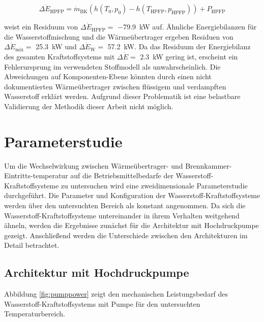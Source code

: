 \begin{equation}\label{Eq:brewer}
	\Delta \dot{E}_\mathrm{HPFP}=\dot{m}_\mathrm{BK}(h(T_0,p_0)-h(T_\mathrm{HPFP}, p_\mathrm{HPFP}))+P_\mathrm{HPFP}
\end{equation}

weist ein Residuum von $\Delta \dot{E}_\mathrm{HPFP}=$ \SI{-79.9}{\kilo\W} auf. Ähnliche Energiebilanzen für die Wasserstoffmischung und die Wärmeübertrager ergeben Residuen von $\Delta \dot{E}_\mathrm{mix}=$ \SI{25.3}{\kilo\W} und $\Delta \dot{E}_\mathrm{W}=$ \SI{57.2}{\kilo\W}. Da das Residuum der Energiebilanz des gesamten Kraftstoffsystems mit $\Delta \dot{E}=$ \SI{2.3}{\kilo\W} gering ist, erscheint ein Fehlerursprung im verwendeten Stoffmodell als unwahrscheinlich. Die Abweichungen auf Komponenten-Ebene könnten durch einen nicht dokumentierten Wärmeübertrager zwischen flüssigem und verdampften Wasserstoff erklärt werden. Aufgrund dieser Problematik ist eine belastbare Validierung der Methodik dieser Arbeit nicht möglich.

\section{Parameterstudie}

Um die Wechselwirkung zwischen Wärmeübertrager- und Brennkammer-Eintritts-temperatur auf die Betriebsmittelbedarfe der Wasserstoff-Kraftstoffsysteme zu untersuchen wird eine zweidimensionale Parameterstudie durchgeführt. Die Parameter und Konfiguration der Wasserstoff-Kraftstoffsysteme werden über den untersuchten Bereich als konstant angenommen. Da sich die Wasserstoff-Kraftstoffsysteme untereinander in ihrem Verhalten weitgehend ähneln, werden die Ergebnisse zunächst für die Architektur mit Hochdruckpumpe gezeigt. Anschließend werden die Unterschiede zwischen den Architekturen im Detail betrachtet.

\subsection{Architektur mit Hochdruckpumpe}

Abbildung \ref{fig:pumppower} zeigt den mechanischen Leistungsbedarf des Wasserstoff-Kraftstoffsystems mit Pumpe für den untersuchten Temperaturbereich. 

